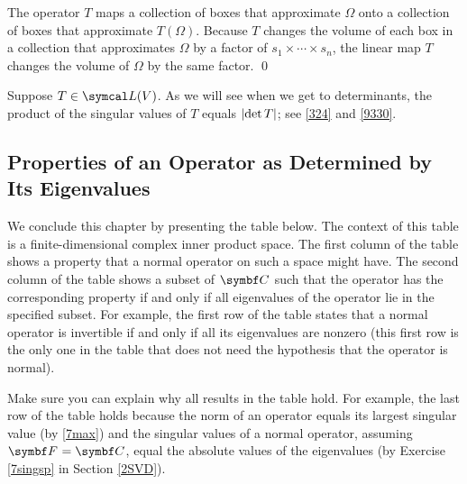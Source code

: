 The operator $T$ maps a collection of boxes that approximate $\Omega$ onto a collection of boxes that approximate $T(\Omega)$.
Because $T$ changes the volume of each box in a collection that approximates $\Omega$ by a factor of $s_1 \times \cdots \times s_n$,
the linear map $T$ changes the volume of $\Omega$ by the same factor.
\qed

Suppose $T \in \L(V)$. As we will see when we get to determinants, the product of the singular values of $T$ equals $\lvert\det T\rvert$; see \ref{324} and \ref{9330}.

\subsection{Properties of an Operator as Determined by Its Eigenvalues}

We conclude this chapter by presenting the table below. The context of this table is a finite-dimensional complex inner product space. The first column of the table shows a property that a normal operator on such a space might have. The second column of the table shows a subset of $\C{}$ such that the operator has the corresponding property if and only if all eigenvalues of the operator lie in the specified subset. For example, the first row of the table states that a normal operator is invertible if and only if all its eigenvalues are nonzero (this first row is the only one in the table that does not need the hypothesis that the operator is normal).

Make sure you can explain why all results in the table hold. For example, the last row of the table holds because the norm of an operator equals its largest singular value (by \ref{7max}) and the singular values of a normal operator, assuming $\F{} = \C{}$, equal the absolute values of the eigenvalues (by Exercise \ref{7singsp} in Section \ref{2SVD}).

